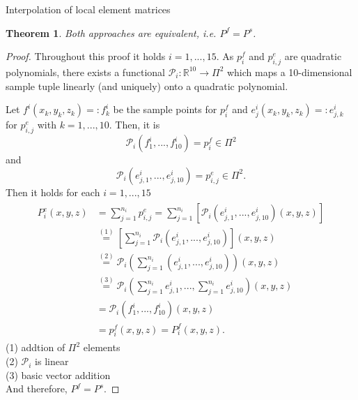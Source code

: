 \documentclass[a4paper,11pt,reqno]{amsart}
\numberwithin{figure}{section}
\numberwithin{table}{section}
\numberwithin{figure}{section}
\def\RR{\mathbb{R}}
\def\P{\mathcal{P}}
\newtheorem{theorem}{Theorem}
\begin{document}
\begin{section}{Interpolation of local element matrices}
\begin{theorem}
\label{theorem:equivalence}
Both approaches are equivalent, i.e. $P^f = P^s$.
\end{theorem}
\begin{proof}
Throughout this proof it holds $i = 1,...,15$.
As $p^f_i$ and $p^e_{i,j}$ are quadratic polynomials, there exists 
a functional $\P_i : \RR^{10} \rightarrow \Pi^2$ which maps a
10-dimensional sample tuple linearly (and uniquely) 
onto a quadratic polynomial.

Let $f^i(x_k,y_k,z_k) =:f_k^i$ be the sample points
for $p^f_i$ and $e^i_j(x_k,y_k,z_k) =:e_{j,k}^i$ for $p^e_{i,j}$
with $k = 1,...,10$.
Then, it is
\begin{equation*}
\P_i(f^i_1,...,f^i_{10}) = p_i^f \in \Pi^2
\end{equation*}
and
\begin{equation*}
\P_i(e^i_{j,1},...,e^i_{j,10}) = p_{i,j}^e \in \Pi^2.
\end{equation*}
Then it holds for each $i= 1,...,15$
\begin{align*}
\begin{split}
P^e_i(x,y,z) &= \sum_{j=1}^{n_i} p^e_{i,j} 
 = \sum_{j=1}^{n_i}\left[\P_i\left(e^i_{j,1},...,e^i_{j,10}\right)(x,y,z)\right] \\
 &\stackrel{(1)}{=} \left[\sum_{j=1}^{n_i}\P_i\left(e^i_{j,1},...,e^i_{j,10}\right)\right](x,y,z) \\
 &\stackrel{(2)}{=} \P_i\left(\sum_{j=1}^{n_i}\left(e^i_{j,1},...,e^i_{j,10}\right)\right)(x,y,z) \\
 &\stackrel{(3)}{=} \P_i\left(\sum_{j=1}^{n_i}e^i_{j,1},...,\sum_{j=1}^{n_i}e^i_{j,10}\right)(x,y,z) \\
 &= \P_i\left(f^i_1,...,f^i_{10}\right)(x,y,z) \\
 &= p_i^f(x,y,z) = P_i^f(x,y,z).
\end{split}
\end{align*}
(1) addtion of $\Pi^2$ elements\\
(2) $\P_i$ is linear \\
(3) basic vector addition\\
And therefore, $P^f = P^s$.
\end{proof}

\end{section}





\end{document}
